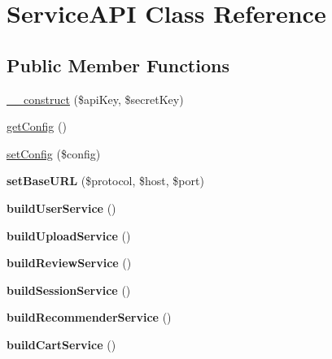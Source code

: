 \hypertarget{class_service_a_p_i}{\section{Service\+A\+P\+I Class Reference}
\label{class_service_a_p_i}
}
\subsection*{Public Member Functions}
\begin{DoxyCompactItemize}
\item 
\hyperlink{class_service_a_p_i_a49f2ad222e06420736d750e167d55d7c}{\+\_\+\+\_\+construct} (\$api\+Key, \$secret\+Key)
\item 
\hyperlink{class_service_a_p_i_a628300eb8464467d9344c7c59cc8770b}{get\+Config} ()
\item 
\hyperlink{class_service_a_p_i_afbdb41bfc6dd8dc9b0b56b062fe04477}{set\+Config} (\$config)
\item 
\hypertarget{class_service_a_p_i_a77e7c846f78f107e69cfc4f3da9432fc}{{\bfseries set\+Base\+U\+R\+L} (\$protocol, \$host, \$port)}\label{class_service_a_p_i_a77e7c846f78f107e69cfc4f3da9432fc}

\item 
\hypertarget{class_service_a_p_i_ab66d08cc2cb659b7f90f7eefa761a28c}{{\bfseries build\+User\+Service} ()}\label{class_service_a_p_i_ab66d08cc2cb659b7f90f7eefa761a28c}

\item 
\hypertarget{class_service_a_p_i_a65012036036651e49569f9061deed3f5}{{\bfseries build\+Upload\+Service} ()}\label{class_service_a_p_i_a65012036036651e49569f9061deed3f5}

\item 
\hypertarget{class_service_a_p_i_a07881e9441e41c2d3690ed553635108d}{{\bfseries build\+Review\+Service} ()}\label{class_service_a_p_i_a07881e9441e41c2d3690ed553635108d}

\item 
\hypertarget{class_service_a_p_i_ac9e7d3be00f6d67a5722bff323380606}{{\bfseries build\+Session\+Service} ()}\label{class_service_a_p_i_ac9e7d3be00f6d67a5722bff323380606}

\item 
\hypertarget{class_service_a_p_i_abda7548b5a32f31ce31ef8d416e4265e}{{\bfseries build\+Recommender\+Service} ()}\label{class_service_a_p_i_abda7548b5a32f31ce31ef8d416e4265e}

\item 
\hypertarget{class_service_a_p_i_aaf23cd1c7f3e1930bccb8865f80e16e1}{{\bfseries build\+Cart\+Service} ()}\label{class_service_a_p_i_aaf23cd1c7f3e1930bccb8865f80e16e1}


\end{DoxyCompactItemize}
